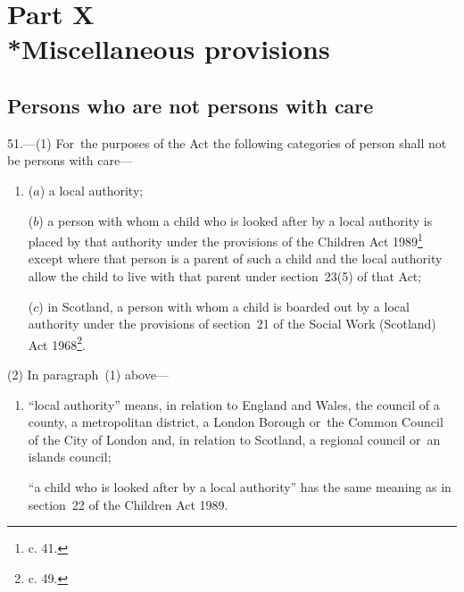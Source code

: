 \documentclass[a4paper,12pt]{article}
\begin{document}
\section[Part X --- Miscellaneous provisions]{Part X\\*Miscellaneous provisions}

\renewcommand\parthead{--- Part X}

\subsection[51. Persons who are not persons with care]{Persons who are not persons with care}

51.—(1) For~the purposes of the Act the following categories of person shall not be persons with care—
\begin{enumerate}\item[]
($a$) a local authority;

($b$) a person with whom a child who is looked after by a local authority is placed by that authority under the provisions of the Children Act 1989\footnote{ c. 41.}
except where that person is a parent of such a child and the local authority allow the child to live with that parent under section~23(5) of that Act; %

($c$) in Scotland, a person with whom a child is boarded out by a local authority under the provisions of section~21 of the Social Work (Scotland) Act 1968\footnote{ c. 49.}.
\end{enumerate}

(2) In paragraph~(1) above—
\begin{enumerate}\item[]
“local authority” means, in relation to England and Wales, the council of a county, a metropolitan district, a London Borough or~the Common Council of the City of London and, in relation to Scotland, a regional council or~an islands council;

“a child who is looked after by a local authority” has the same meaning as in section~22 of the Children Act 1989.
\end{enumerate}

\end{document}
